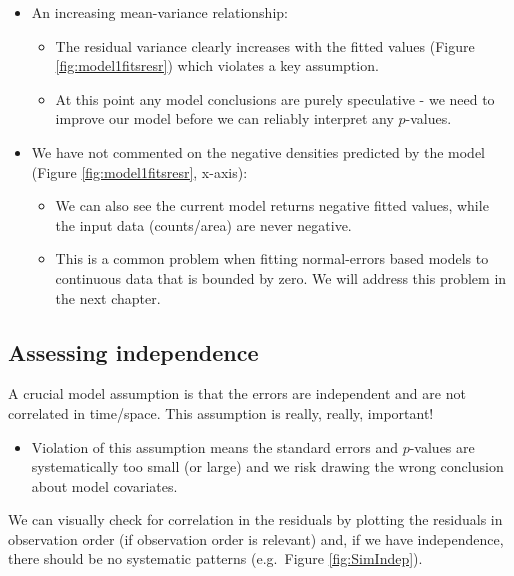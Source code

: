 \documentclass[
  oneside]{krantz}
\providecommand{\tightlist}{%
  \setlength{\itemsep}{0pt}\setlength{\parskip}{0pt}}
\begin{document}
\begin{itemize}
\item
  An increasing mean-variance relationship:

  \begin{itemize}
  \tightlist
  \item
    The residual variance clearly increases with the fitted values (Figure \ref{fig:model1fitsresr}) which violates a key assumption.
  \item
    At this point any model conclusions are purely speculative - we need to improve our model before we can reliably interpret any \(p\)-values.
  \end{itemize}
\item
  We have not commented on the negative densities predicted by the model (Figure \ref{fig:model1fitsresr}, x-axis):

  \begin{itemize}
  \tightlist
  \item
    We can also see the current model returns negative fitted values, while the input data (counts/area) are never negative.
  \item
    This is a common problem when fitting normal-errors based models to continuous data that is bounded by zero. We will address this problem in the next chapter.
  \end{itemize}
\end{itemize}

\hypertarget{assessing-independence}{%
\subsection{Assessing independence}\label{assessing-independence}}

A crucial model assumption is that the errors are independent and are not correlated in time/space. This assumption is really, really, important!

\begin{itemize}
\tightlist
\item
  Violation of this assumption means the standard errors and \(p\)-values are systematically too small (or large) and we risk drawing the wrong conclusion about model covariates.
\end{itemize}

We can visually check for correlation in the residuals by plotting the residuals in observation order (if observation order is relevant) and, if we have independence, there should be no systematic patterns (e.g.~Figure \ref{fig:SimIndep}).
\end{document}
